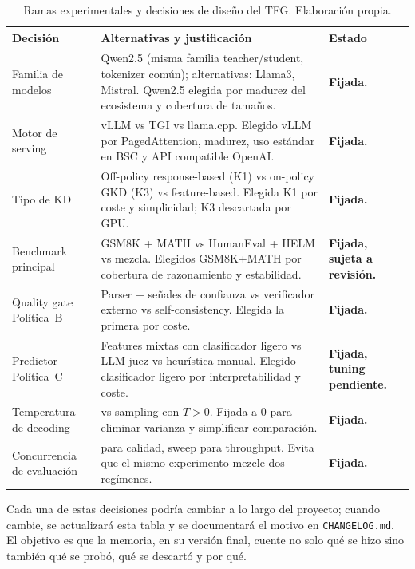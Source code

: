 \begin{table}[H]
\centering
\caption{Ramas experimentales y decisiones de diseño del TFG. Elaboración propia.}
\label{tab:ramas}
\footnotesize
\begin{tabularx}{\textwidth}{>{\raggedright\arraybackslash}p{3cm} >{\raggedright\arraybackslash}X >{\raggedright\arraybackslash}p{3cm}}
\toprule
\textbf{Decisión} & \textbf{Alternativas y justificación} & \textbf{Estado} \\
\midrule
Familia de modelos & Qwen2.5 (misma familia teacher/student, tokenizer común); alternativas: Llama3, Mistral. Qwen2.5 elegida por madurez del ecosistema y cobertura de tamaños. & \textbf{Fijada.} \\
\addlinespace
Motor de serving & vLLM vs TGI vs llama.cpp. Elegido vLLM por PagedAttention, madurez, uso estándar en BSC y API compatible OpenAI. & \textbf{Fijada.} \\
\addlinespace
Tipo de KD & Off-policy response-based (K1) vs on-policy GKD (K3) vs feature-based. Elegida K1 por coste y simplicidad; K3 descartada por GPU. & \textbf{Fijada.} \\
\addlinespace
Benchmark principal & GSM8K + MATH vs HumanEval + HELM vs mezcla. Elegidos GSM8K+MATH por cobertura de razonamiento y estabilidad. & \textbf{Fijada, sujeta a revisión.} \\
\addlinespace
Quality gate Política~B & Parser + señales de confianza vs verificador externo vs self-consistency. Elegida la primera por coste. & \textbf{Fijada.} \\
\addlinespace
Predictor Política~C & Features mixtas con clasificador ligero vs LLM juez vs heurística manual. Elegido clasificador ligero por interpretabilidad y coste. & \textbf{Fijada, tuning pendiente.} \\
\addlinespace
Temperatura de decoding & 0 vs sampling con $T>0$. Fijada a 0 para eliminar varianza y simplificar comparación. & \textbf{Fijada.} \\
\addlinespace
Concurrencia de evaluación & 1 para calidad, sweep para throughput. Evita que el mismo experimento mezcle dos regímenes. & \textbf{Fijada.} \\
\bottomrule
\end{tabularx}
\end{table}

Cada una de estas decisiones podría cambiar a lo largo del proyecto; cuando cambie, se actualizará esta tabla y se documentará el motivo en \texttt{CHANGELOG.md}. El objetivo es que la memoria, en su versión final, cuente no solo qué se hizo sino también qué se probó, qué se descartó y por qué.

